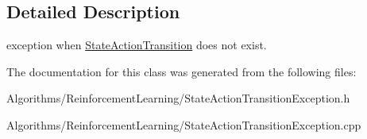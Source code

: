 \subsection{Detailed Description}
exception when \hyperlink{classAI_1_1Algorithm_1_1StateActionTransition}{State\-Action\-Transition} does not exist. 

The documentation for this class was generated from the following files\-:\begin{DoxyCompactItemize}
\item 
Algorithms/\-Reinforcement\-Learning/State\-Action\-Transition\-Exception.\-h\item 
Algorithms/\-Reinforcement\-Learning/State\-Action\-Transition\-Exception.\-cpp\end{DoxyCompactItemize}
